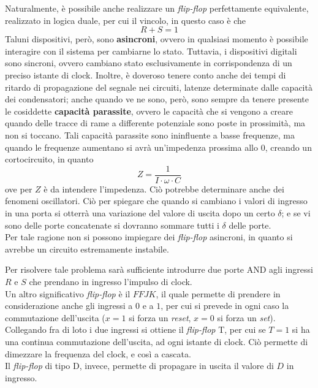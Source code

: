 \documentclass[a4paper]{extarticle}
\begin{document}
\vspace{1em}
\noindent
Naturalmente, è possibile anche realizzare un \textit{flip-flop} perfettamente equivalente, realizzato in logica duale, per cui il vincolo, in questo caso è che
\[R + S = 1\]
Taluni dispositivi, però, sono \textbf{asincroni}, ovvero in qualsiasi momento è possibile interagire con il sistema per cambiarne lo stato. Tuttavia, i dispositivi digitali sono sincroni, ovvero cambiano stato esclusivamente in corrispondenza di un preciso istante di clock. Inoltre, è doveroso tenere conto anche dei tempi di ritardo di propagazione del segnale nei circuiti, latenze determinate dalle capacità dei condensatori; anche quando ve ne sono, però, sono sempre da tenere presente le cosiddette \textbf{capacità parassite}, ovvero le capacità che si vengono a creare quando delle tracce di rame a differente potenziale sono poste in prossimità, ma non si toccano. Tali capacità parassite sono ininfluente a basse frequenze, ma quando le frequenze aumentano si avrà un'impedenza prossima allo \(0\), creando un cortocircuito, in quanto
\[Z = \frac{1}{I \cdot \omega \cdot C}\]
ove per \(Z\) è da intendere l'impedenza. Ciò potrebbe determinare anche dei fenomeni oscillatori. Ciò per spiegare che quando si cambiano i valori di ingresso in una porta si otterrà una variazione del valore di uscita dopo un certo \(\delta\); e se vi sono delle porte concatenate si dovranno sommare tutti i \(\delta\) delle porte.\\
Per tale ragione non si possono impiegare dei \textit{flip-flop} asincroni, in quanto si avrebbe un circuito estremamente instabile.

\vspace{1em}
\noindent
Per risolvere tale problema sarà sufficiente introdurre due porte AND agli ingressi \(R\) e \(S\) che prendano in ingresso l'impulso di clock.\\
Un altro significativo \textit{flip-flop} è il \(FFJK\), il quale permette di prendere in considerazione anche gli ingressi a \(0\) e a \(1\), per cui si prevede in ogni caso la commutazione dell'uscita (\(x = 1\) si forza un \textit{reset}, \(x = 0\) si forza un \textit{set}).\\
Collegando fra di loto i due ingressi si ottiene il \textit{flip-flop} T, per cui se \(T = 1\) si ha una continua commutazione dell'uscita, ad ogni istante di clock. Ciò permette di dimezzare la frequenza del clock, e così a cascata.\\
Il \textit{flip-flop} di tipo D, invece, permette di propagare in uscita il valore di \(D\) in ingresso.
\end{document}

